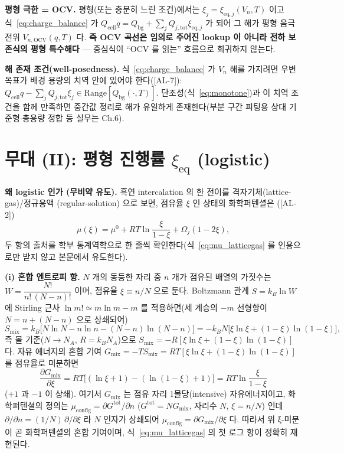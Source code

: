 \documentclass[11pt,a4paper]{article}
\newcommand{\eq}{\mathrm{eq}}
\newcommand{\bg}{\mathrm{bg}}
\newcommand{\cell}{\mathrm{cell}}
\newcommand{\OCV}{\mathrm{OCV}}
\newcommand{\tot}{\mathrm{tot}}
\newcommand{\AL}[1]{\textsf{[AL-#1]}}
\begin{document}
\textbf{평형 극한 = OCV.} 평형(또는 충분히 느린 조건)에서는 $\xi_j=\xi_{\eq,j}(V_n,T)$ 이고
식~\eqref{eq:charge_balance} 가 $Q_\cell q=Q_\bg+\sum_j Q_{j,\tot}\xi_{\eq,j}$ 가 되어 그 해가 평형 음극
전위 $V_{n,\OCV}(q,T)$ 다. \textbf{즉 OCV 곡선은 임의로 주어진 lookup 이 아니라 전하 보존식의 평형
특수해다} — 중심식이 ``OCV 를 읽는'' 흐름으로 회귀하지 않는다.

\textbf{해 존재 조건(well-posedness).} 식~\eqref{eq:charge_balance} 가 $V_n$ 해를 가지려면 우변 목표가 배경
용량의 치역 안에 있어야 한다(\AL{7}): $Q_\cell q-\sum_j Q_{j,\tot}\xi_j\in\mathrm{Range}[Q_\bg(\cdot,T)]$.
단조성(식~\eqref{eq:monotone})과 이 치역 조건을 함께 만족하면 중간값 정리로 해가 유일하게 존재한다(부분
구간 피팅용 상대 기준형$\cdot$총용량 정합 등 실무는 Ch.6).

\section{무대 (II): 평형 진행률 $\xi_\eq$ (logistic)}\label{sec:eq}
\textbf{왜 logistic 인가 (무비약 유도).} 흑연 intercalation 의 한 전이를 격자기체(lattice-gas)/정규용액
(regular-solution) 으로 보면, 점유율 $\xi$ 인 상태의 화학퍼텐셜은 \cite{mckinnon1983,bazant2013}(\AL{2})
\begin{equation}
\mu(\xi)=\mu^0+RT\ln\frac{\xi}{1-\xi}+\Omega_j(1-2\xi),
\label{eq:mu_latticegas}
\end{equation}
두 항의 출처를 학부 통계역학으로 한 줄씩 확인한다(식~\eqref{eq:mu_latticegas} 를 인용으로만 받지 않고 본문에서 유도한다).

\textbf{(i) 혼합 엔트로피 항.} $N$ 개의 동등한 자리 중 $n$ 개가 점유된 배열의 가짓수는
$W=\dfrac{N!}{n!\,(N-n)!}$ 이며, 점유율 $\xi\equiv n/N$ 으로 둔다. Boltzmann 관계 $S=k_B\ln W$ 에 Stirling
근사 $\ln m!\simeq m\ln m-m$ 를 적용하면(세 계승의 $-m$ 선형항이 $N=n+(N-n)$ 으로 상쇄되어)
\begin{equation}
S_{\mathrm{mix}}=k_B\big[N\ln N-n\ln n-(N-n)\ln(N-n)\big]
=-k_B N\big[\xi\ln\xi+(1-\xi)\ln(1-\xi)\big],
\label{eq:smix}
\end{equation}
즉 몰 기준($N\!\to\!N_A$, $R=k_B N_A$)으로 $S_{\mathrm{mix}}=-R[\xi\ln\xi+(1-\xi)\ln(1-\xi)]$ 다. 자유
에너지의 혼합 기여 $G_{\mathrm{mix}}=-TS_{\mathrm{mix}}=RT[\xi\ln\xi+(1-\xi)\ln(1-\xi)]$ 를 점유율로 미분하면
\begin{equation}
\frac{\partial G_{\mathrm{mix}}}{\partial\xi}=RT\big[(\ln\xi+1)-(\ln(1-\xi)+1)\big]=RT\ln\frac{\xi}{1-\xi}
\label{eq:mu_mix}
\end{equation}
($+1$ 과 $-1$ 이 상쇄). 여기서 $G_{\mathrm{mix}}$ 는 점유 자리 1몰당(intensive) 자유에너지이고, 화학퍼텐셜의 정의는
$\mu_{\mathrm{config}}=\partial G^{\mathrm{tot}}/\partial n$ ($G^{\mathrm{tot}}=N G_{\mathrm{mix}}$, 자리수 $N$, $\xi=n/N$)
인데 $\partial/\partial n=(1/N)\,\partial/\partial\xi$ 라 $N$ 인자가 상쇄되어 $\mu_{\mathrm{config}}=\partial G_{\mathrm{mix}}/\partial\xi$
다. 따라서 위 ξ-미분이 곧 화학퍼텐셜의 혼합 기여이며, 식~\eqref{eq:mu_latticegas} 의 첫 로그 항이 정확히 재현된다.
\end{document}
